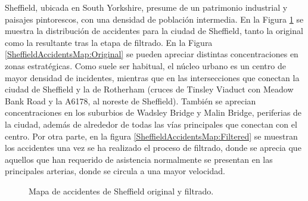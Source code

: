 \documentclass{uathesis-es}
\begin{document}
{		Sheffield, ubicada en South Yorkshire, presume de un patrimonio industrial y paisajes pintorescos, con una densidad de población intermedia. En la Figura \ref{SheffieldAccidentsMap} se muestra la distribución de accidentes para la ciudad de Sheffield, tanto la original como la resultante tras la etapa de filtrado. En la Figura \ref{SheffieldAccidentsMap:Original} se pueden apreciar distintas concentraciones en zonas estratégicas. Como suele ser habitual, el núcleo urbano es un centro de mayor densidad de incidentes, mientras que en las intersecciones que conectan la ciudad de Sheffield y la de Rotherham (cruces de Tinsley Viaduct con Meadow Bank Road y la A6178, al noreste de Sheffield). También se aprecian concentraciones en los suburbios de Wadsley Bridge y Malin Bridge, periferias de la ciudad, además de alrededor de todas las vías principales que conectan con el centro. Por otra parte, en la figura \ref{SheffieldAccidentsMap:Filtered} se muestran los accidentes una vez se ha realizado el proceso de filtrado, donde se aprecia que aquellos que han requerido de asistencia normalmente se presentan en las principales arterias, donde se circula a una mayor velocidad.
		
		
		\begin{figure}[H]
			\centering
			\caption{Mapa de accidentes de Sheffield original y filtrado.}
			\label{SheffieldAccidentsMap}
		\end{figure}
		
}
\end{document}
